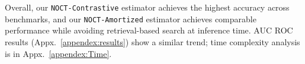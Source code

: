


Overall, our \texttt{NOCT-Contrastive} estimator achieves the highest accuracy across benchmarks, and our  \texttt{NOCT-Amortized} estimator achieves comparable performance while avoiding retrieval-based search at inference time. AUC ROC results (Appx.~\ref{appendex:results}) show a similar trend; time complexity analysis is in Appx.~\ref{appendex:Time}.



